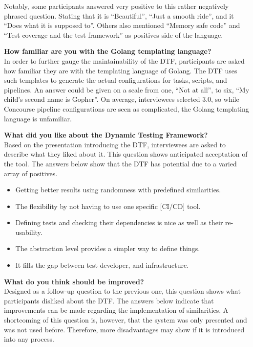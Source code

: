 Notably, some participants answered very positive to this rather negatively phrased question.
Stating that it is ``Beautiful'', ``Just a smooth ride'', and it ``Does what it is supposed to''.
Others also mentioned ``Memory safe code'' and ``Test coverage and the test framework'' as positives side of the language.

\textbf{How familiar are you with the Golang templating language?}\\
In order to further gauge the maintainability of the DTF, participants are asked how familiar they are with the templating language of Golang.
The DTF uses such templates to generate the actual configurations for tasks, scripts, and pipelines.
An answer could be given on a scale from one, ``Not at all'', to six, ``My child's second name is Gopher''.
On average, interviewees selected $3.0$, so while Concourse pipeline configurations are seen as complicated, the Golang templating language is unfamiliar.

\textbf{What did you like about the Dynamic Testing Framework?}\\
Based on the presentation introducing the DTF, interviewees are asked to describe what they liked about it.
This question shows anticipated acceptation of the tool.
The answers below show that the DTF has potential due to a varied array of positives.

\begin{itemize}
    \item Getting better results using randomness with predefined similarities.
    \item The flexibility by not having to use one specific [CI/CD] tool.
    \item Defining tests and checking their dependencies is nice as well as their re-usability.
    \item The abstraction level provides a simpler way to define things.
    \item It fills the gap between test-developer, and infrastructure.
\end{itemize}

\textbf{What do you think should be improved?}\\
Designed as a follow-up question to the previous one, this question shows what participants disliked about the DTF.
The answers below indicate that improvements can be made regarding the implementation of similarities.
A shortcoming of this question is, however, that the system was only presented and was not used before.
Therefore, more disadvantages may show if it is introduced into any process.


